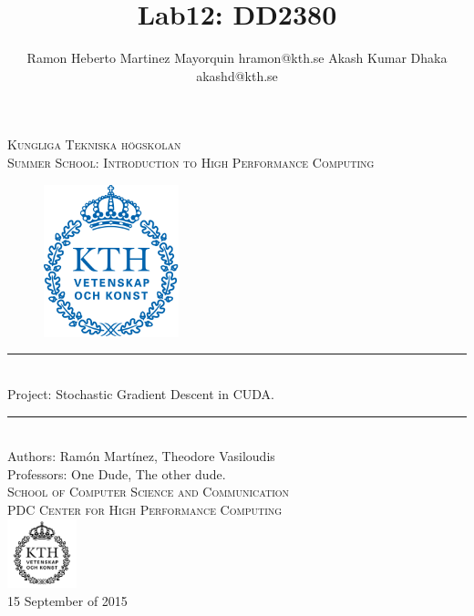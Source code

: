 \documentclass[11pt,a4paper]{article}
\title{Lab12: DD2380 }
\author{
Ramon Heberto Martinez Mayorquin  hramon@kth.se 
Akash Kumar Dhaka  akashd@kth.se 
}
\newcommand{\HRule}{\rule{\linewidth}{0.5mm}}
\begin{document}
\begin{titlepage}
\begin{center}

\textsc{\LARGE Kungliga Tekniska högskolan}\\[1.0cm]

\textsc{\Large Summer School: Introduction to High Performance Computing}\\[2.0cm]



\begin{figure}[H]
	\centering
 \includegraphics[width=0.35\textwidth]{Kth_logo.png}
\end{figure}
%

\HRule \\[0.4cm]
{ \huge  Project: Stochastic Gradient Descent in CUDA.
}\\[0.4cm]
\HRule \\[1.5cm]


Authors: Ram\'on  Mart\'inez, Theodore Vasiloudis   \\ 
\large Professors: One Dude, The other dude.  \\ [2.5cm]

\textsc{\Large School of Computer Science and Communication \\
PDC Center for High Performance Computing}\\ [1.0cm] 
\includegraphics[width=0.15\textwidth]{KTH_black.png}\\[1.5cm] %
{\large 15 September of 2015}

\end{center}
\end{titlepage}
\end{document}
